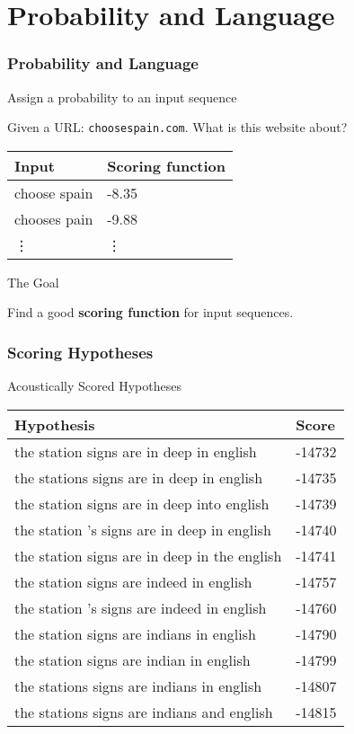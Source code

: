 \documentclass[handout]{beamer}
\begin{document}


\section{Probability and Language}
\frame{\tableofcontents[currentsection]}

\begin{frame}
\frametitle{Probability and Language}
\centering
\begin{block}{Assign a probability to an input sequence}
\par Given a URL: \texttt{choosespain.com}. What is this website about?

\pause
\smallskip
\begin{tabular}{ll}
Input & Scoring function \\
\hline
choose spain & -8.35 \\
chooses pain & -9.88 \\
\vdots & \vdots
\end{tabular}
\end{block}

\pause
\begin{block}{The Goal}
\par Find a good \textbf{scoring function} for input sequences.
\end{block}

\end{frame}

\begin{frame}
\frametitle{Scoring Hypotheses}
\centering
\begin{block}{Acoustically Scored Hypotheses}

\begin{tabular}{ll}
Hypothesis & Score \\
\hline
the station signs are in deep in english & -14732 \\
the stations signs are in deep in english & -14735 \\
the station signs are in deep into english & -14739 \\
the station 's signs are in deep in english & -14740 \\
the station signs are in deep in the english & -14741 \\
the station signs are indeed in english & -14757 \\
the station 's signs are indeed in english & -14760 \\ 
the station signs are indians in english & -14790 \\
the station signs are indian in english & -14799 \\
the stations signs are indians in english & -14807 \\
the stations signs are indians and english & -14815 
\end{tabular}
\end{block}
\end{frame}
\end{document}
